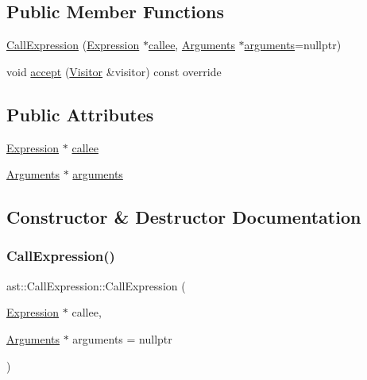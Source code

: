 \subsection*{Public Member Functions}
\begin{DoxyCompactItemize}
\item 
\hyperlink{structast_1_1_call_expression_a4f89b2a241988623c1378a85db795356}{Call\+Expression} (\hyperlink{structast_1_1_expression}{Expression} $\ast$\hyperlink{structast_1_1_call_expression_a6b944439ac86b3d9a8bf984be9a213b9}{callee}, \hyperlink{structast_1_1_arguments}{Arguments} $\ast$\hyperlink{structast_1_1_call_expression_a733b720a818f5c75f2ea96e40360a6ba}{arguments}=nullptr)
\item 
void \hyperlink{structast_1_1_call_expression_abc165321a5ce18456ae0eb51541a4b7e}{accept} (\hyperlink{structast_1_1_visitor}{Visitor} \&visitor) const override
\end{DoxyCompactItemize}
\subsection*{Public Attributes}
\begin{DoxyCompactItemize}
\item 
\hyperlink{structast_1_1_expression}{Expression} $\ast$ \hyperlink{structast_1_1_call_expression_a6b944439ac86b3d9a8bf984be9a213b9}{callee}
\item 
\hyperlink{structast_1_1_arguments}{Arguments} $\ast$ \hyperlink{structast_1_1_call_expression_a733b720a818f5c75f2ea96e40360a6ba}{arguments}
\end{DoxyCompactItemize}


\subsection{Constructor \& Destructor Documentation}
\mbox{\label{structast_1_1_call_expression_a4f89b2a241988623c1378a85db795356}} 
\subsubsection{\texorpdfstring{Call\+Expression()}{CallExpression()}}
{\footnotesize\ttfamily ast\+::\+Call\+Expression\+::\+Call\+Expression (\begin{DoxyParamCaption}\item[{\hyperlink{structast_1_1_expression}{Expression} $\ast$}]{callee,  }\item[{\hyperlink{structast_1_1_arguments}{Arguments} $\ast$}]{arguments = {\ttfamily nullptr} }\end{DoxyParamCaption})\hspace{0.3cm}{\ttfamily [inline]}}




